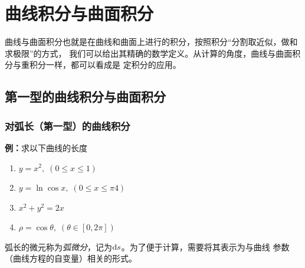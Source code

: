 \setcounter{chapter}{10}

\chapter{曲线积分与曲面积分}

曲线与曲面积分也就是在曲线和曲面上进行的积分，按照积分“分割取近似，做和求极限”的方式，
我们可以给出其精确的数学定义。从计算的角度，曲线与曲面积分与重积分一样，都可以看成是
定积分的应用。

\section{第一型的曲线积分与曲面积分}

\subsection{对弧长（第一型）的曲线积分}


{\bf 例：}求以下曲线的长度
\begin{enumerate}[(1)]
  \setlength{\itemindent}{1cm}
  \item $y=x^2,\;(0\leq x\leq 1)$
  \item $y=\ln\cos x,\;(0\leq x\leq\pi4)$
  \item $x^2+y^2=2x$
  \item $\rho=\cos\theta,\;(\theta\in[0,2\pi])$
\end{enumerate}

弧长的微元称为{\it 弧微分}，记为$\mathrm{d} s$。为了便于计算，需要将其表示为与曲线
参数（曲线方程的自变量）相关的形式。
	
\begin{center}
\end{center}

